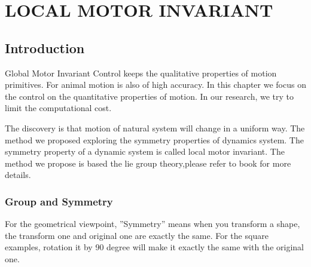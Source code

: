 \chapter{LOCAL MOTOR INVARIANT}
\label{chap:li}

\ifpdf
    \graphicspath{{LocalInvariant/LocalInvariantFigs/PNG/}{LocalInvariant/LocalInvariantFigs/PDF/}{LocalInvariant/LocalInvariantFigs/}}
\else
    \graphicspath{{LocalInvariant/LocalInvariantFigs/EPS/}{LocalInvariant/LocalInvariantFigs/}}
\fi

\section{Introduction}
Global Motor Invariant Control keeps the qualitative properties of motion primitives.
For animal motion is also of high accuracy.
In this chapter we focus on the control on the quantitative properties of motion.
In our research, we try to limit the computational cost.


The discovery is that motion of natural system will change in a uniform way.
The method we proposed exploring the symmetry properties of dynamics system.
The symmetry property of a dynamic system is called local motor invariant.
The method we propose is based the lie group theory,please refer to book\citep{olver1986applications}
for more details.

\subsection{Group and Symmetry}
For the geometrical viewpoint, ''Symmetry''  means when you transform a shape, the transform one and original one are exactly the same.
For the square examples, rotation it by 90 degree will make it exactly the same with the original one.



